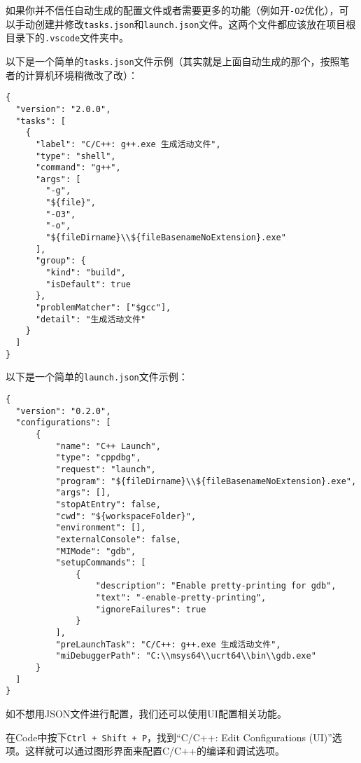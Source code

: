 如果你并不信任自动生成的配置文件或者需要更多的功能（例如开\texttt{-O2}优化），可以手动创建并修改\texttt{tasks.json}和\texttt{launch.json}文件。这两个文件都应该放在项目根目录下的\texttt{.vscode}文件夹中。

以下是一个简单的\texttt{tasks.json}文件示例（其实就是上面自动生成的那个，按照笔者的计算机环境稍微改了改）：

\begin{lstlisting}
{
  "version": "2.0.0",
  "tasks": [
    {
      "label": "C/C++: g++.exe 生成活动文件",
      "type": "shell",
      "command": "g++",
      "args": [
        "-g",
        "${file}",
        "-O3",
        "-o",
        "${fileDirname}\\${fileBasenameNoExtension}.exe"
      ],
      "group": {
        "kind": "build",
        "isDefault": true
      },
      "problemMatcher": ["$gcc"],
      "detail": "生成活动文件"
    }
  ]
}
\end{lstlisting}

以下是一个简单的\texttt{launch.json}文件示例：

\begin{lstlisting}
{
  "version": "0.2.0",
  "configurations": [
      {
          "name": "C++ Launch",
          "type": "cppdbg",
          "request": "launch",
          "program": "${fileDirname}\\${fileBasenameNoExtension}.exe",
          "args": [],
          "stopAtEntry": false,
          "cwd": "${workspaceFolder}",
          "environment": [],
          "externalConsole": false,
          "MIMode": "gdb",
          "setupCommands": [
              {
                  "description": "Enable pretty-printing for gdb",
                  "text": "-enable-pretty-printing",
                  "ignoreFailures": true
              }
          ],
          "preLaunchTask": "C/C++: g++.exe 生成活动文件",
          "miDebuggerPath": "C:\\msys64\\ucrt64\\bin\\gdb.exe"
      }
  ]
}
\end{lstlisting}

如不想用JSON文件进行配置，我们还可以使用UI配置相关功能。

在Code中按下\texttt{Ctrl + Shift + P}，找到“C/C++: Edit Configurations (UI)”选项。这样就可以通过图形界面来配置C/C++的编译和调试选项。

